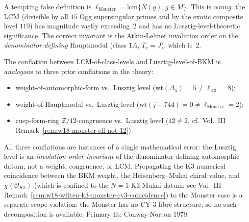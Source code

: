 \begin{remark}
\label{rem:latfnd-w18-witten-LCM-vs-ell}
A tempting false definition is $\ell_{\mathrm{Monster}} =
\mathrm{lcm}\{N(g) : g\in M\}$. This is \emph{wrong}: the LCM
(divisible by all $15$ Ogg supersingular primes and by the exotic
composite level $119$) has magnitude vastly exceeding~$2$ and has
no Lusztig-level-theoretic significance. The correct invariant is
the Atkin-Lehner involution order on the
\emph{denominator-defining} Hauptmodul (class $1A$, $T_e = J$),
which is~$2$.

The conflation between LCM-of-class-levels and Lusztig-level-of-BKM
is \emph{analogous} to three prior conflations in the theory:
\begin{itemize}
\item weight-of-automorphic-form vs.\ Lusztig level
 ($\mathrm{wt}(\Delta_5) = 5 \ne \ell_{\mathrm{K3}} = 8$);
\item weight-of-Hauptmodul vs.\ Lusztig level
 ($\mathrm{wt}(j - 744) = 0 \ne \ell_{\mathrm{Monster}} = 2$);
\item cusp-form-ring $\mathbb{Z}/12$-congruence vs.\ Lusztig level
 ($12 \ne 2$, cf.~Vol.~III
 Remark~\ref{rem:w18-monster-ell-not-12}).
\end{itemize}
All three conflations are instances of a single mathematical error:
the Lusztig level is an \emph{involution-order invariant} of the
denominator-defining automorphic datum, not a weight, congruence,
or LCM. Propagating the K3 numerical coincidence between the
BKM weight, the Heisenberg--Mukai chiral value, and
$\chi(\mathcal{O}_{K3})$ (which is confined to the $N=1$ K3
Mukai datum; see Vol.~III
Remark~\ref{rem:w18-witten-k3-monster-cy3-coincidence}) to the
Monster case is a separate scope violation: the Monster has no
CY-3 fibre structure, so no such decomposition is available.
Primary-lit: Conway-Norton 1979.
\end{remark}

